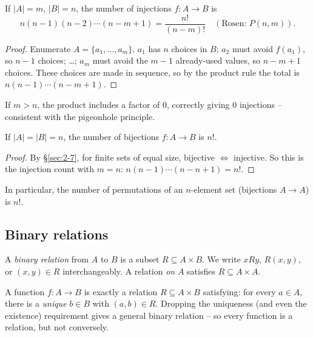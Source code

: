 \documentclass[11pt]{article}
\begin{document}
\begin{theorem}
If $|A|=m$, $|B|=n$, the number of injections $f: A \to B$ is
\[
n(n-1)(n-2)\cdots(n-m+1) = \frac{n!}{(n-m)!} \quad (\text{Rosen: } P(n,m)).
\]
\end{theorem}
\begin{proof}
Enumerate $A = \{a_1,\dots,a_m\}$. $a_1$ has $n$ choices in $B$; $a_2$ must avoid $f(a_1)$, so $n-1$ choices; \dots; $a_m$ must avoid the $m-1$ already-used values, so $n-m+1$ choices. These choices are made in sequence, so by the product rule the total is $n(n-1)\cdots(n-m+1)$.
\end{proof}

\begin{note}
If $m > n$, the product includes a factor of $0$, correctly giving $0$ injections -- consistent with the pigeonhole principle.
\end{note}

\begin{theorem}
If $|A|=|B|=n$, the number of bijections $f: A \to B$ is $n!$.
\end{theorem}
\begin{proof}
By \S\ref{sec:2-7}, for finite sets of equal size, bijective $\iff$ injective. So this is the injection count with $m=n$: $n(n-1)\cdots(n-n+1) = n!$.
\end{proof}

\begin{note}
In particular, the number of permutations of an $n$-element set (bijections $A \to A$) is $n!$.
\end{note}

\subsection{Binary relations}
\label{sec:2-13}

\begin{definition}
A \emph{binary relation} from $A$ to $B$ is a subset $R \subseteq A \times B$. We write $x R y$, $R(x,y)$, or $(x,y) \in R$ interchangeably. A relation \emph{on} $A$ satisfies $R \subseteq A \times A$.
\end{definition}

\begin{note}
A function $f: A \to B$ is exactly a relation $R \subseteq A \times B$ satisfying: for every $a \in A$, there is a \emph{unique} $b \in B$ with $(a,b) \in R$. Dropping the uniqueness (and even the existence) requirement gives a general binary relation -- so every function is a relation, but not conversely.
\end{note}
\end{document}

